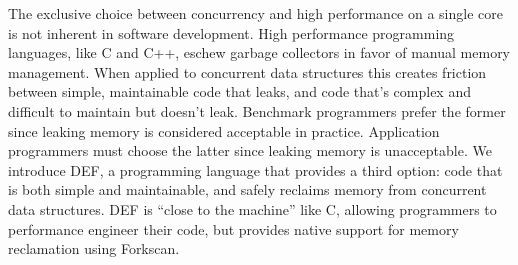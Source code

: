 The exclusive choice between concurrency and high performance on a single core is not inherent in software development.  High performance programming languages, like C and C++, eschew garbage collectors in favor of manual memory management.  When applied to concurrent data structures this creates friction between simple, maintainable code that leaks, and code that's complex and difficult to maintain but doesn't leak.  Benchmark programmers prefer the former since leaking memory is considered acceptable in practice.  Application programmers must choose the latter since leaking memory is unacceptable.  We introduce DEF, a programming language that provides a third option: code that is both simple and maintainable, and safely reclaims memory from concurrent data structures.  DEF is ``close to the machine'' like C, allowing programmers to performance engineer their code, but provides native support for memory reclamation using Forkscan.
